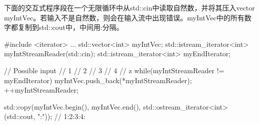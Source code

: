下面的交互式程序段在一个无限循环中从std::cin中读取自然数，并将其压入vector myIntVec。若输入不是自然数，则会在输入流中出现错误。myIntVec中的所有数字都复制到std::cout中，中间用:分隔。

\begin{cpp}
#include <iterator>
...
std::vector<int> myIntVec;
std::istream_iterator<int> myIntStreamReader(std::cin);
std::istream_iterator<int> myEndIterator;

// Possible input
// 1
// 2
// 3
// 4
// z
while(myIntStreamReader != myEndIterator){
	myIntVec.push_back(*myIntStreamReader);
	++myIntStreamReader;
}

std::copy(myIntVec.begin(), myIntVec.end(),
			std::ostream_iterator<int>(std::cout, ":"));
			// 1:2:3:4:
\end{cpp}




























